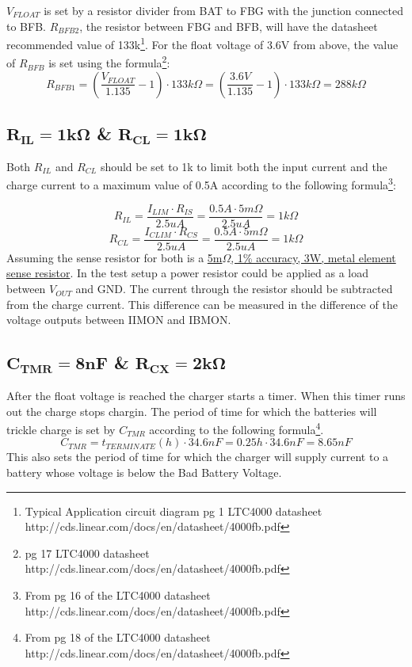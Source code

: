 \documentclass{article}
\begin{document}
$V_{FLOAT}$ is set by a resistor divider from BAT to FBG with the junction connected to BFB. $R_{BFB2}$, the resistor between FBG and BFB, will have the datasheet recommended value of 133k\footnote{Typical Application circuit diagram pg 1 LTC4000 datasheet http://cds.linear.com/docs/en/datasheet/4000fb.pdf}. For the float voltage of 3.6V from above, the value of $R_{BFB}$ is set using the formula\footnote{pg 17 LTC4000 datasheet http://cds.linear.com/docs/en/datasheet/4000fb.pdf}: 
\[R_{BFB1} = \left ( \frac{V_{FLOAT}}{1.135} - 1 \right ) \cdot 133k\Omega = \left ( \frac{3.6V}{1.135} - 1 \right ) \cdot 133k\Omega  = 288k\Omega\]

\subsection{$\mathbf{R_{IL}=1k\Omega}$ \& $\mathbf{R_{CL}=1k\Omega}$}
Both $R_{IL}$ and $R_{CL}$ should be set to 1k to limit both the input current and the charge current to a maximum value of 0.5A according to the following formula\footnote{From pg 16  of the LTC4000 datasheet http://cds.linear.com/docs/en/datasheet/4000fb.pdf}:

\[R_{IL} = \frac{I_{LIM} \cdot R_{IS}}{2.5uA} = \frac{0.5A\cdot5m\Omega}{2.5uA}=1k\Omega\]
\[R_{CL} = \frac{I_{CLIM} \cdot R_{CS}}{2.5uA} =\frac{0.5A\cdot5m\Omega}{2.5uA}=1k\Omega\]
Assuming the sense resistor for both is a \href{http://www.digikey.com/product-detail/en/PWR4412-2SCR0050F/PWR4412-2SCR0050F-ND/2564433}{5m$\Omega$, 1\% accuracy, 3W, metal element sense resistor}. In the test setup a power resistor could be applied as a load between $V_{OUT}$ and GND. The current through the resistor should be subtracted from the charge current. This difference can be measured in the difference of the voltage outputs between IIMON and IBMON.

\subsection{$\mathbf{C_{TMR}=8nF}$ \& $\mathbf{R_{CX}=2k\Omega}$}
After the float voltage is reached the charger starts a timer. When this timer runs out the charge stops chargin. The period of time for which the batteries will trickle charge is set by $C_{TMR}$ according to the following formula\footnote{From pg 18 of the LTC4000 datasheet http://cds.linear.com/docs/en/datasheet/4000fb.pdf}.
\[C_{TMR} = t_{TERMINATE}(h) \cdot 34.6nF = 0.25h \cdot 34.6nF = 8.65nF\]
This also sets the period of time for which the charger will supply current to a battery whose voltage is below the Bad Battery Voltage. 
\end{document}
